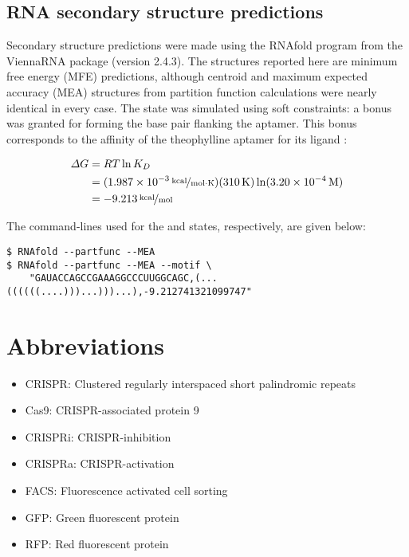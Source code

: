\documentclass[10pt,oneside]{article}
\begin{document}
\subsection{RNA secondary structure predictions}

Secondary structure predictions were made using the RNAfold program from the ViennaRNA package (version 2.4.3).  The structures reported here are minimum free energy (MFE) predictions, although centroid and maximum expected accuracy (MEA) structures from partition function calculations were nearly identical in every case.  The \holo{} state was simulated using soft constraints: a  bonus was granted for forming the base pair flanking the aptamer.  This bonus corresponds to the  affinity of the theophylline aptamer for its ligand \autocite{jenison1994}:

\begin{align*}
\Delta G
    &= RT \ln K_D \\
    &= (\unitfrac[\mathrm{1.987 \times 10^{-3}}]{kcal}{mol \cdot K}) 
       (\unit[\mathrm{310}]{K}) 
       \ln (\unit[\mathrm{3.20 \times 10^{-4}}]{M}) \\
    &= \unitfrac[\mathrm{-9.213}]{kcal}{mol} \\
\end{align*}

The command-lines used for the \apo{} and \holo{} states, respectively, are given below:

\begin{verbatim}
$ RNAfold --partfunc --MEA
$ RNAfold --partfunc --MEA --motif \
    "GAUACCAGCCGAAAGGCCCUUGGCAGC,(...((((((....)))...)))...),-9.212741321099747"
\end{verbatim}



\section{Abbreviations}

\begin{itemize}
    \item CRISPR: Clustered regularly interspaced short palindromic repeats
    \item Cas9: CRISPR-associated protein 9
    \item CRISPRi: CRISPR-inhibition
    \item CRISPRa: CRISPR-activation
    \item FACS: Fluorescence activated cell sorting
    \item GFP: Green fluorescent protein
    \item RFP: Red fluorescent protein
\end{itemize}
\end{document}
